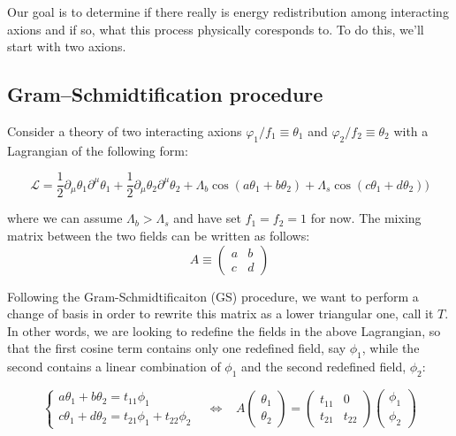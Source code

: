 \documentclass{article}
\begin{document}
Our goal is to determine if there really is energy redistribution among interacting axions and if so, what this process physically coresponds to. To do this, we'll start with two axions.

\subsection{Gram–Schmidtification procedure}
Consider a theory of two interacting axions $\varphi_1/f_1\equiv\theta_1$ and $\varphi_2/f_2\equiv\theta_2$ with a Lagrangian of the following form:

\begin{equation}
    \label{eq:pre-GS-potential}
    \mathcal{L} = \frac{1}{2}\partial_\mu\theta_1 \partial^\mu\theta_1  + \frac{1}{2}\partial_\mu\theta_2 \partial^\mu\theta_2  + \Lambda_{b}\cos{(a\theta_1+b\theta_2)}+\Lambda_{s}\cos{(c\theta_1+d\theta_2))}
\end{equation}

\noindent where we can assume $\Lambda_b>\Lambda_s$ and have set $f_1 = f_2 = 1$ for now. The mixing matrix between the two fields can be written as follows:
\begin{equation}
A \equiv
    \begin{pmatrix}
    a & b\\
    c & d
    \end{pmatrix}
\end{equation}

Following the Gram-Schmidtificaiton (GS) procedure, we want to perform a change of basis in order to rewrite this  matrix as a lower triangular one, call it $T$. In other words, we are looking to redefine the fields in the above Lagrangian, so that the first cosine term contains only one redefined field, say $\phi_1$, while the second contains a linear combination of  $\phi_1$ and the second redefined field, $\phi_2$:

\begin{equation}
    \label{eq:triang}
    \begin{cases}
        a\theta_1+b\theta_2 = t_{11} \phi_1 \\ 
        c\theta_1+d\theta_2 = t_{21} \phi_1 + t_{22} \phi_2
    \end{cases} \,\,\,\,\,
    \Leftrightarrow \,\,\,\,\,
    A \begin{pmatrix}
        \theta_1 \\
        \theta_2
    \end{pmatrix}
    = 
    \begin{pmatrix}
        t_{11} & 0 \\
        t_{21} &t_{22} 
    \end{pmatrix} 
    \begin{pmatrix}
        \phi_1 \\
        \phi_2
    \end{pmatrix}
\end{equation}
\end{document}
